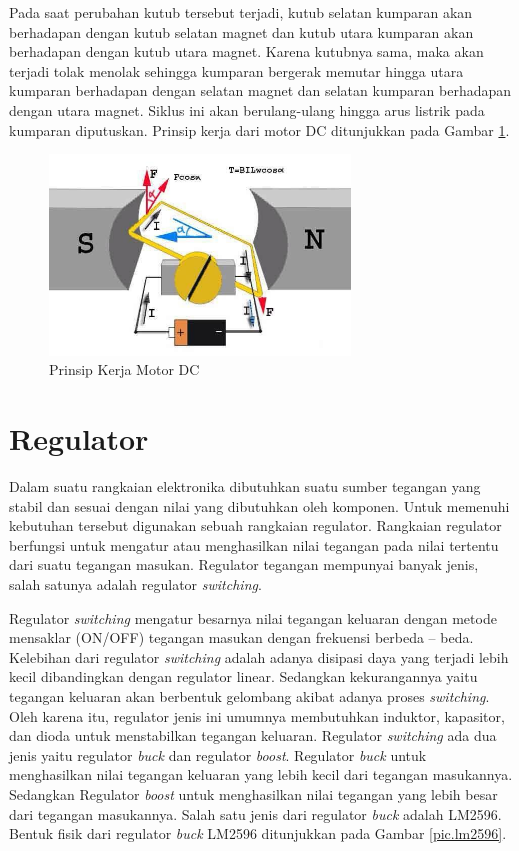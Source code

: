 Pada saat perubahan kutub tersebut terjadi, kutub selatan kumparan akan berhadapan dengan kutub selatan magnet dan kutub utara kumparan akan berhadapan dengan kutub utara magnet. Karena kutubnya sama, maka akan terjadi tolak menolak sehingga kumparan bergerak memutar hingga utara kumparan berhadapan dengan selatan magnet dan selatan kumparan berhadapan dengan utara magnet. Siklus ini akan berulang-ulang hingga arus listrik pada kumparan diputuskan. Prinsip kerja dari motor DC ditunjukkan pada Gambar \ref{pic.motordcprinsipkerja}.
\begin{figure}[H]
	\centering
	\includegraphics[width=8cm]{gambar/prinsipDC.jpg}
	\caption{Prinsip Kerja Motor DC}
	\label{pic.motordcprinsipkerja}
\end{figure}


\section{Regulator}
Dalam suatu rangkaian elektronika dibutuhkan suatu sumber tegangan yang stabil dan sesuai dengan nilai yang dibutuhkan oleh komponen. Untuk memenuhi kebutuhan tersebut digunakan sebuah rangkaian regulator. Rangkaian regulator berfungsi untuk mengatur atau menghasilkan nilai tegangan pada nilai tertentu dari suatu tegangan masukan. Regulator tegangan mempunyai banyak jenis, salah satunya adalah regulator \textit{switching}\cite{sitohang2018}.

Regulator \textit{switching} mengatur besarnya nilai tegangan keluaran dengan metode mensaklar (ON/OFF) tegangan masukan dengan frekuensi berbeda – beda. Kelebihan dari regulator \textit{switching} adalah adanya disipasi daya yang terjadi lebih kecil dibandingkan dengan regulator linear. Sedangkan kekurangannya yaitu tegangan keluaran akan berbentuk gelombang akibat adanya proses \textit{switching}. Oleh karena itu, regulator jenis ini umumnya membutuhkan induktor, kapasitor, dan dioda untuk menstabilkan tegangan keluaran. Regulator \textit{switching} ada dua jenis yaitu regulator \textit{buck} dan regulator \textit{boost}. Regulator \textit{buck} untuk menghasilkan nilai tegangan keluaran yang lebih kecil dari tegangan masukannya. Sedangkan Regulator \textit{boost} untuk menghasilkan nilai tegangan yang lebih besar dari tegangan masukannya. Salah satu jenis dari regulator \textit{buck} adalah LM2596\cite{semiconductor2008}. Bentuk fisik dari regulator \textit{buck} LM2596 ditunjukkan pada Gambar \ref{pic.lm2596}.

